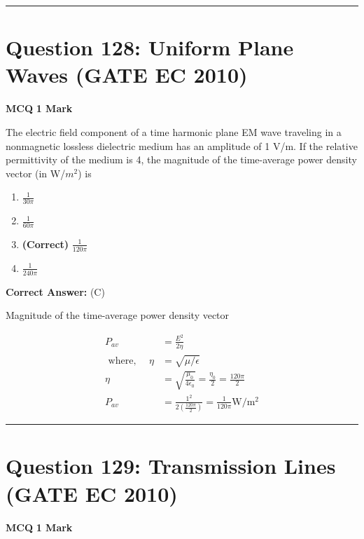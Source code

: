 \documentclass[11pt,a4paper]{article}
\begin{document}
\vspace{1.5em}
\hrule
\vspace{1.5em}

\section*{Question 128: Uniform Plane Waves (GATE EC 2010)}
\noindent \textbf{\color{primary}MCQ} \hfill \textbf{\color{secondary}1 Mark}


\noindent The electric field component of a time harmonic plane EM wave traveling in
a nonmagnetic lossless dielectric medium has an amplitude of 1 V/m. If the
relative permittivity of the medium is 4, the magnitude of the time-average
power density vector (in W/$m^{2}$) is


\begin{enumerate}[label=(\Alph*)]
    \item $\frac{1}{30\pi }$
    \item $\frac{1}{60\pi }$
    \item \textbf{(Correct)} $\frac{1}{120\pi }$
    \item $\frac{1}{240\pi }$
\end{enumerate}

\noindent \textbf{Correct Answer:} (C)

\begin{tcolorbox}[solbox, title=Detailed Solution -- Question 128]
Magnitude of the time-average power density
 vector

\[
\begin{aligned} P_{a v} &=\frac{E^{2}}{2 \eta} \\ \text { where, } \quad\eta &=\sqrt{\mu / \epsilon} \\ \eta &=\sqrt{\frac{\mu_{0}}{4 \epsilon_{0}}}=\frac{\eta_{0}}{2}=\frac{120 \pi}{2} \\ P_{a v} &=\frac{1^{2}}{2\left(\frac{120 \pi}{2}\right)}=\frac{1}{120 \pi} \mathrm{W} / \mathrm{m}^{2} \end{aligned}
\]
\end{tcolorbox}

\vspace{1.5em}
\hrule
\vspace{1.5em}

\section*{Question 129: Transmission Lines (GATE EC 2010)}
\noindent \textbf{\color{primary}MCQ} \hfill \textbf{\color{secondary}1 Mark}
\end{document}
